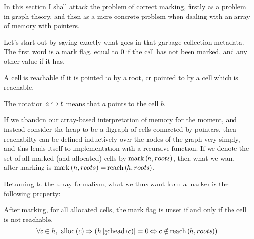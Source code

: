 In this section I shall attack the problem of correct marking, firstly
as a problem in graph theory, and then as a more concrete problem when
dealing with an array of memory with pointers.

Let's start out by saying exactly what goes in that \gls{garbage
  collection} metadata. The first word is a mark flag, equal to 0 if
the \gls{cell} has not been marked, and any other value if it has.

\begin{definition}[Reachable]
  \label{def:ms-reachable}
  A cell is reachable if it is pointed to by a root, or pointed to by
  a cell which is reachable.

  \begin{minipage}{.5\textwidth}
    \begin{prooftree}
    \end{prooftree}
  \end{minipage}
  \begin{minipage}{.5\textwidth}
    \begin{prooftree}
    \end{prooftree}
  \end{minipage}

  The notation $a \pointsto b$ means that $a$ points to the cell $b$.
\end{definition}

If we abandon our array-based interpretation of memory for the moment,
and instead consider the \gls{heap} to be a digraph of \glspl{cell}
connected by \glspl{pointer}, then reachabilty can be defined
inductively over the nodes of the graph very simply, and this lends
itself to implementation with a recursive function. If we denote the
set of all marked (and allocated) cells by $\markset{h}{roots}$, then
what we want after marking is $\markset{h}{roots} = \reach{h}{roots}$.

Returning to the array formalism, what we thus want from a marker is
the following property:

\begin{definition}
  \label{def:ms-correct-marking}
  After marking, for all allocated \glspl{cell}, the mark flag is
  unset if and only if the \gls{cell} is not reachable.
  \[\forall c \in h,\ \alloc{c} \implies
  \left(h\left[\gchead{c}\right] = 0 \iff c \notin
    \reach{h}{roots}\right)\]
\end{definition}

